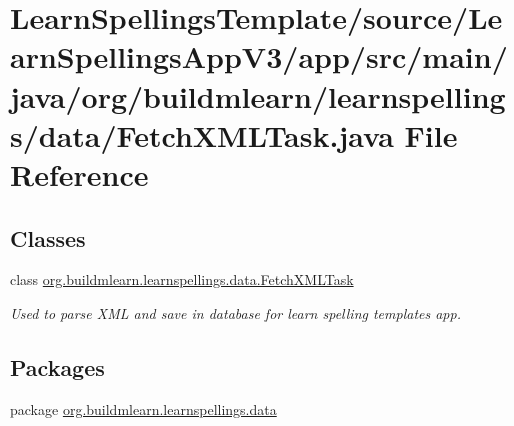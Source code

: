 \hypertarget{LearnSpellingsTemplate_2source_2LearnSpellingsAppV3_2app_2src_2main_2java_2org_2buildmlearn_2leab3fa6db2a33d5d8ffbdefb598115c987}{}\section{Learn\+Spellings\+Template/source/\+Learn\+Spellings\+App\+V3/app/src/main/java/org/buildmlearn/learnspellings/data/\+Fetch\+X\+M\+L\+Task.java File Reference}
\label{LearnSpellingsTemplate_2source_2LearnSpellingsAppV3_2app_2src_2main_2java_2org_2buildmlearn_2leab3fa6db2a33d5d8ffbdefb598115c987}
\subsection*{Classes}
\begin{DoxyCompactItemize}
\item 
class \hyperlink{classorg_1_1buildmlearn_1_1learnspellings_1_1data_1_1FetchXMLTask}{org.\+buildmlearn.\+learnspellings.\+data.\+Fetch\+X\+M\+L\+Task}
\begin{DoxyCompactList}\small\item\em Used to parse X\+ML and save in database for learn spelling template\textquotesingle{}s app. \end{DoxyCompactList}\end{DoxyCompactItemize}
\subsection*{Packages}
\begin{DoxyCompactItemize}
\item 
package \hyperlink{namespaceorg_1_1buildmlearn_1_1learnspellings_1_1data}{org.\+buildmlearn.\+learnspellings.\+data}
\end{DoxyCompactItemize}
